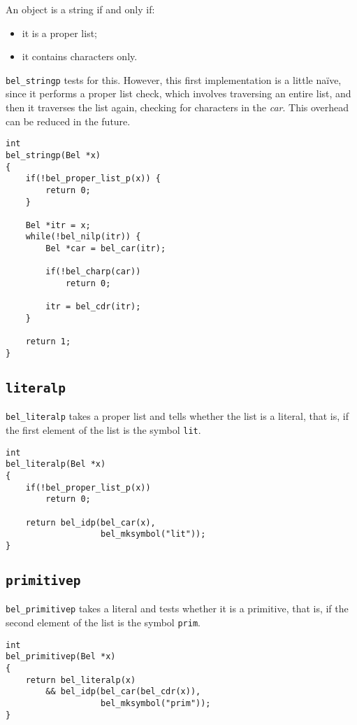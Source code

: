 \documentclass[openright,a4paper,twoside,12pt]{memoir}
\begin{document}
An object is a string if and only if:

\begin{itemize}
\item it is a proper list;
\item it contains characters only.
\end{itemize}

\texttt{bel\_stringp} tests for this. However, this first implementation is a
little naïve, since it performs a proper list check, which involves
traversing an entire list, and then it traverses the list again,
checking for characters in the \emph{car}. This overhead can be reduced in
the future.

\begin{verbatim}
int
bel_stringp(Bel *x)
{
    if(!bel_proper_list_p(x)) {
        return 0;
    }

    Bel *itr = x;
    while(!bel_nilp(itr)) {
        Bel *car = bel_car(itr);

        if(!bel_charp(car))
            return 0;

        itr = bel_cdr(itr);
    }

    return 1;
}
\end{verbatim}

\subsection{\texttt{literalp}}
\label{sec:org1118e75}

\texttt{bel\_literalp} takes a proper list and tells whether the list is a
literal, that is, if the first element of the list is the symbol \texttt{lit}.

\begin{verbatim}
int
bel_literalp(Bel *x)
{
    if(!bel_proper_list_p(x))
        return 0;

    return bel_idp(bel_car(x),
                   bel_mksymbol("lit"));
}
\end{verbatim}

\subsection{\texttt{primitivep}}
\label{sec:orgbcc0b56}

\texttt{bel\_primitivep} takes a literal and tests whether it is a primitive,
that is, if the second element of the list is the symbol \texttt{prim}.

\begin{verbatim}
int
bel_primitivep(Bel *x)
{
    return bel_literalp(x)
        && bel_idp(bel_car(bel_cdr(x)),
                   bel_mksymbol("prim"));
}
\end{verbatim}
\end{document}
